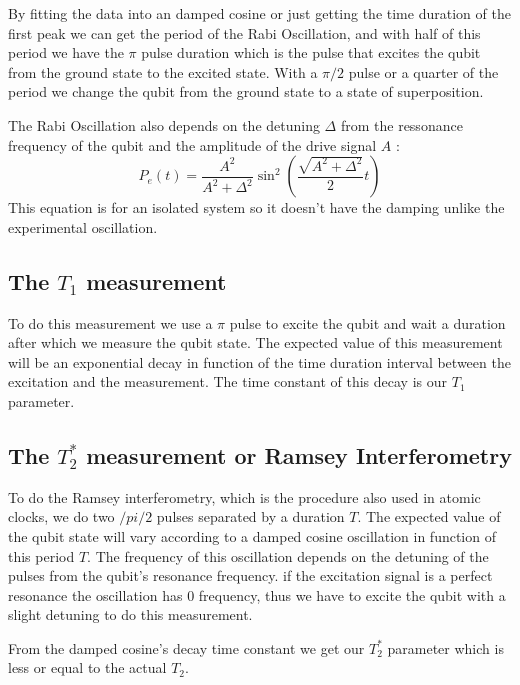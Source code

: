 \documentclass[11pt,onecolumm,a4paper]{article}
\begin{document}
By fitting the data into an damped cosine or just getting the time duration of the first peak we can get the period of the Rabi Oscillation, and with half of this period we have the $\pi$ pulse duration which is the pulse that excites the qubit from the ground state to the excited state. With a $\pi/2$ pulse or a quarter of the period we change the qubit from the ground state to a state of superposition.

The Rabi Oscillation also depends on the detuning $\Delta$ from the ressonance frequency of the qubit and the amplitude of the drive signal $A$ \cite{Naghiloo2019IntroductionQubits}:
\begin{equation}
    P_e(t)= \frac{A^2}{A^2+\Delta^2} \sin^2(\frac{\sqrt{A^2+\Delta^2}}{2}t)
\end{equation}
 This equation is for an isolated system so it doesn't have the damping unlike the experimental oscillation.
 
\subsection{The $T_1$ measurement}
To do this measurement we use a $\pi$ pulse to excite the qubit and wait a duration after which we measure the qubit state. The expected value of this measurement will be an exponential decay in function of the time duration interval between the excitation and the measurement. The time constant of this decay is our $T_1$ parameter.

\subsection{The $T_2^*$ measurement or Ramsey Interferometry}
To do the Ramsey interferometry, which is the procedure also used in atomic clocks, we do two $/pi/2$ pulses separated by a duration $T$. The expected value of the qubit state will vary according to a damped cosine oscillation in function of this period $T$. The frequency of this oscillation depends on the detuning of the pulses from the qubit's resonance frequency. if the excitation signal is a perfect resonance the oscillation has 0 frequency, thus we have to excite the qubit with a slight detuning to do this measurement. 

From the damped cosine's decay time constant we get our $T_2^*$ parameter which is less or equal to the actual $T_2$.
\end{document}
